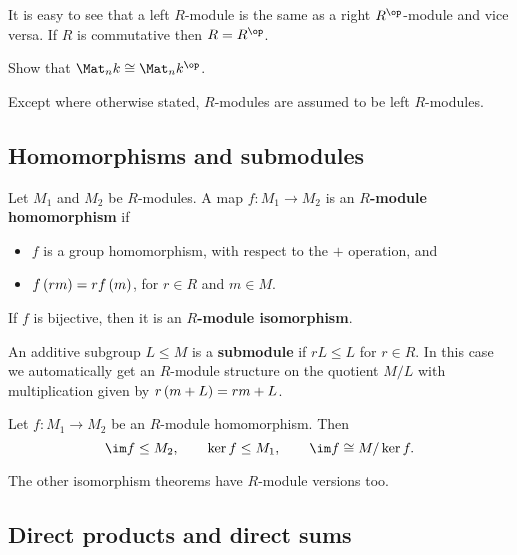 It is easy to see that a left $ R $-module is the same as a right $ R^{\op} $-module and vice versa. If $ R $ is commutative then $ R = R^{\op} $.

\begin{exercise*}
Show that $ \Mat_n k \cong \Mat_n k^{\op} $.
\end{exercise*}

Except where otherwise stated, $ R $-modules are assumed to be left $ R $-modules.

\pagebreak

\subsection{Homomorphisms and submodules}

\begin{definition}
Let $ M_1 $ and $ M_2 $ be $ R $-modules. A map $ f : M_1 \to M_2 $ is an \textbf{$ R $-module homomorphism} if
\begin{itemize}
\item $ f $ is a group homomorphism, with respect to the $ + $ operation, and
\item $ f\br{rm} = rf\br{m} $, for $ r \in R $ and $ m \in M $.
\end{itemize}
If $ f $ is bijective, then it is an \textbf{$ R $-module isomorphism}.
\end{definition}

\begin{definition}
An additive subgroup $ L \le M $ is a \textbf{submodule} if $ rL \le L $ for $ r \in R $. In this case we automatically get an $ R $-module structure on the quotient $ M / L $ with multiplication given by $ r\br{m + L} = rm + L $.
\end{definition}

\begin{theorem}
Let $ f : M_1 \to M_2 $ be an $ R $-module homomorphism. Then
$$ \im f \le M_2, \qquad \ker f \le M_1, \qquad \im f \cong M / \ker f. $$
\end{theorem}

The other isomorphism theorems have $ R $-module versions too.

\subsection{Direct products and direct sums}


